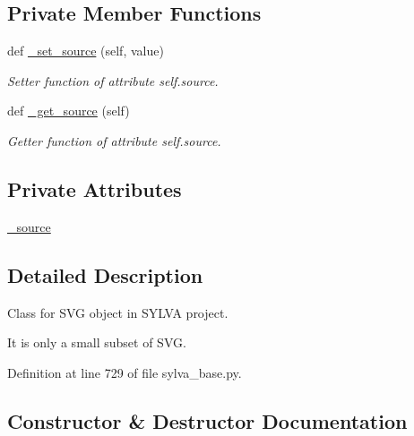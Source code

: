 \subsection*{Private Member Functions}
\begin{DoxyCompactItemize}
\item 
def \hyperlink{classsylva_1_1base_1_1sylva__base_1_1_s_y_l_v_a_s_v_g_af0aa37478ec3ba1167ae2cc18cdd12b8}{\+\_\+set\+\_\+source} (self, value)
\begin{DoxyCompactList}\small\item\em Setter function of attribute self.\+source. \end{DoxyCompactList}\item 
def \hyperlink{classsylva_1_1base_1_1sylva__base_1_1_s_y_l_v_a_s_v_g_ab5193e954ce5acbbf148e9874c0637e5}{\+\_\+get\+\_\+source} (self)
\begin{DoxyCompactList}\small\item\em Getter function of attribute self.\+source. \end{DoxyCompactList}\end{DoxyCompactItemize}
\subsection*{Private Attributes}
\begin{DoxyCompactItemize}
\item 
\hyperlink{classsylva_1_1base_1_1sylva__base_1_1_s_y_l_v_a_s_v_g_a313167adc69d8d8a40f447cb293d6988}{\+\_\+source}
\end{DoxyCompactItemize}


\subsection{Detailed Description}
Class for S\+VG object in S\+Y\+L\+VA project. 

It is only a small subset of S\+VG. 

Definition at line 729 of file sylva\+\_\+base.\+py.



\subsection{Constructor \& Destructor Documentation}
\mbox{\label{classsylva_1_1base_1_1sylva__base_1_1_s_y_l_v_a_s_v_g_a6e199f060579bb2fa9eb8c9fca634b30}} 
